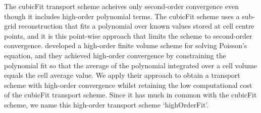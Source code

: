 

The cubicFit transport scheme acheives only second-order convergence even though it includes high-order polynomial terms.
The cubicFit scheme uses a sub-grid reconstruction that fits a polynomial over known values stored at cell centre points, and it is this point-wise approach that limits the scheme to second-order convergence.
\citet{devendran2017} developed a high-order finite volume scheme for solving Poisson’s equation, and they achieved high-order convergence by constraining the polynomial fit so that the average of the polynomial integrated over a cell volume equals the cell average value.
We apply their approach to obtain a transport scheme with high-order convergence whilst retaining the low computational cost of the cubicFit transport scheme.
Since it has much in common with the cubicFit scheme, we name this high-order transport scheme `highOrderFit'.





